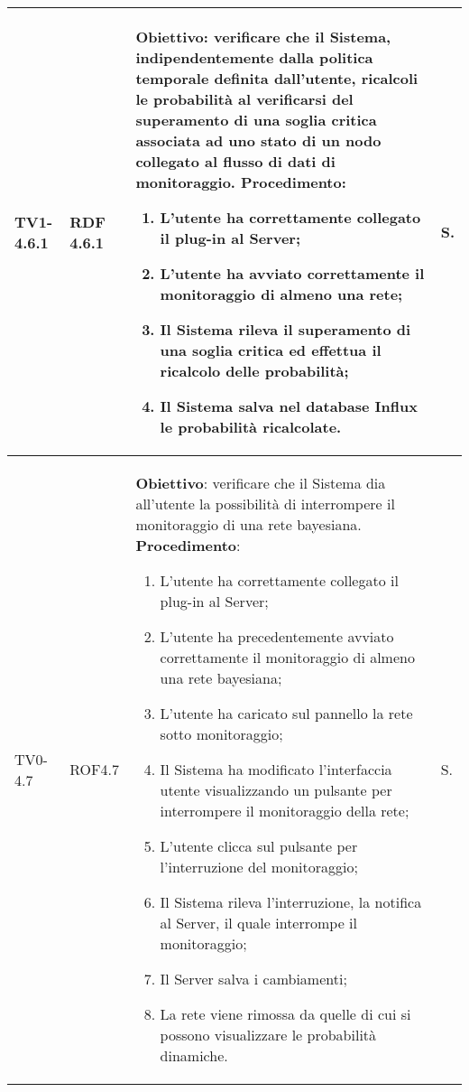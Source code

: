 \begin{longtable}{|C{.15\textwidth}|C{.13\textwidth}|m{.65\textwidth}|C{.08\textwidth}|}
TV1-4.6.1 & RDF 4.6.1 &
	\textbf{Obiettivo}: verificare che il Sistema, indipendentemente dalla politica temporale definita dall'utente, ricalcoli le probabilità al verificarsi del superamento di una soglia critica associata ad uno stato di un nodo collegato al flusso di dati di monitoraggio. \newline
	\textbf{Procedimento}:
	\begin{enumerate}
		\item L'utente ha correttamente collegato il plug-in al Server;
		\item L'utente ha avviato correttamente il monitoraggio di almeno una rete;
		\item Il Sistema rileva il superamento di una soglia critica ed effettua il ricalcolo delle probabilità;
		\item Il Sistema salva nel database Influx le probabilità ricalcolate.
	\end{enumerate}
	& S. \\
\hline

TV0-4.7 & ROF4.7 &
	\textbf{Obiettivo}: verificare che il Sistema dia all'utente la possibilità di interrompere il monitoraggio di una rete bayesiana. \newline
	\textbf{Procedimento}:
	\begin{enumerate}
		\item L'utente ha correttamente collegato il plug-in al Server;
		\item L'utente ha precedentemente avviato correttamente il monitoraggio di almeno una rete bayesiana;
		\item L'utente ha caricato sul pannello la rete sotto monitoraggio;
		\item Il Sistema ha modificato l'interfaccia utente visualizzando un pulsante per interrompere il monitoraggio della rete;
		\item L'utente clicca sul pulsante per l'interruzione del monitoraggio;
		\item Il Sistema rileva l'interruzione, la notifica al Server, il quale interrompe il monitoraggio;
		\item Il Server salva i cambiamenti;
		\item La rete viene rimossa da quelle di cui si possono visualizzare le probabilità dinamiche.
	\end{enumerate}
	& S. \\
\hline


\end{longtable}
